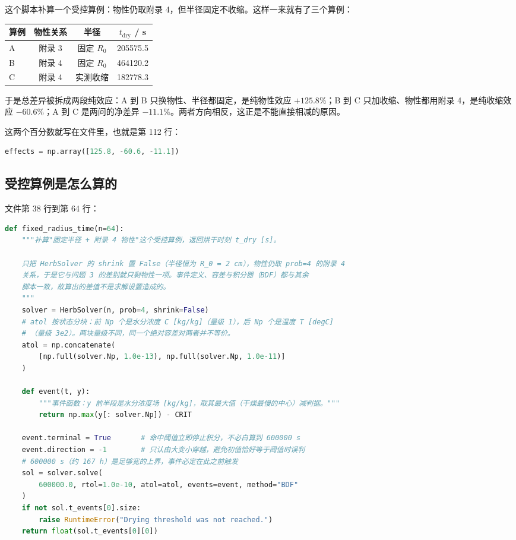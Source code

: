 这个脚本补算一个受控算例：物性仍取附录 4，但半径固定不收缩。这样一来就有了三个算例：

\begin{center}
\begin{tabular}{@{}lccc@{}}
\toprule
算例 & 物性关系 & 半径 & $t_{\mathrm{dry}}$ / s \\
\midrule
A & 附录 3 & 固定 $R_0$ & 205575.5 \\
B & 附录 4 & 固定 $R_0$ & 464120.2 \\
C & 附录 4 & 实测收缩 & 182778.3 \\
\bottomrule
\end{tabular}
\end{center}

于是总差异被拆成两段纯效应：A 到 B 只换物性、半径都固定，是纯物性效应 $+125.8\%$；B 到 C 只加收缩、物性都用附录 4，是纯收缩效应 $-60.6\%$；A 到 C 是两问的净差异 $-11.1\%$。两者方向相反，这正是不能直接相减的原因。

这两个百分数就写在文件里，也就是第 112 行：

\begin{lstlisting}[language=Python]
    effects = np.array([125.8, -60.6, -11.1])
\end{lstlisting}

\subsection{受控算例是怎么算的}

文件第 38 行到第 64 行：

\begin{lstlisting}[language=Python]
def fixed_radius_time(n=64):
    """补算"固定半径 + 附录 4 物性"这个受控算例，返回烘干时刻 t_dry [s]。

    只把 HerbSolver 的 shrink 置 False（半径恒为 R_0 = 2 cm），物性仍取 prob=4 的附录 4
    关系，于是它与问题 3 的差别就只剩物性一项。事件定义、容差与积分器（BDF）都与其余
    脚本一致，故算出的差值不是求解设置造成的。
    """
    solver = HerbSolver(n, prob=4, shrink=False)
    # atol 按状态分块：前 Np 个是水分浓度 C [kg/kg]（量级 1），后 Np 个是温度 T [degC]
    # （量级 3e2）。两块量级不同，同一个绝对容差对两者并不等价。
    atol = np.concatenate(
        [np.full(solver.Np, 1.0e-13), np.full(solver.Np, 1.0e-11)]
    )

    def event(t, y):
        """事件函数：y 前半段是水分浓度场 [kg/kg]，取其最大值（干燥最慢的中心）减判据。"""
        return np.max(y[: solver.Np]) - CRIT

    event.terminal = True       # 命中阈值立即停止积分，不必白算到 600000 s
    event.direction = -1        # 只认由大变小穿越，避免初值恰好等于阈值时误判
    # 600000 s（约 167 h）是足够宽的上界，事件必定在此之前触发
    sol = solver.solve(
        600000.0, rtol=1.0e-10, atol=atol, events=event, method="BDF"
    )
    if not sol.t_events[0].size:
        raise RuntimeError("Drying threshold was not reached.")
    return float(sol.t_events[0][0])
\end{lstlisting}

